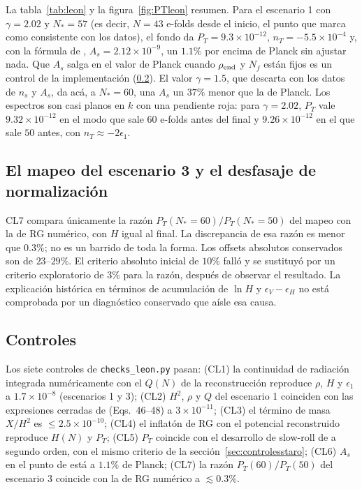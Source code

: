 La tabla~\ref{tab:leon} y la figura~\ref{fig:PTleon} resumen. Para el escenario 1 con $\gamma=2.02$ y $N_*=57$ (es decir, $N=43$ e-folds desde el inicio, el punto que \cite{piccirilli23} marca como consistente con los datos), el fondo da $P_T=9.3\times10^{-12}$, $n_T=-5.5\times10^{-4}$ y, con la fórmula de \cite{piccirilli23}, $A_s=2.12\times10^{-9}$, un $1.1\%$ por encima de Planck sin ajustar nada. Que $A_s$ salga en el valor de Planck cuando $\rho_{\rm end}$ y $N_f$ están fijos es un control de la implementación (\ref{sec:leoncontroles}). El valor $\gamma=1.5$, que \cite{piccirilli23} descarta con los datos de $n_s$ y $A_s$, da acá, a $N_*=60$, una $A_s$ un $37\%$ menor que la de Planck. Los espectros son casi planos en $k$ con una pendiente roja: para $\gamma=2.02$, $P_T$ vale $9.32\times10^{-12}$ en el modo que sale $60$ e-folds antes del final y $9.26\times10^{-12}$ en el que sale $50$ antes, con $n_T\approx-2\epsilon_1$.

\subsection{El mapeo del escenario 3 y el desfasaje de normalización}
\label{sec:leonmapeo}

CL7 compara únicamente la razón $P_T(N_*=60)/P_T(N_*=50)$ del mapeo con la de RG numérico, con $H$ igual al final. La discrepancia de esa razón es menor que $0.3\%$; no es un barrido de toda la forma. Los offsets absolutos conservados son de $23$--$29\%$. El criterio absoluto inicial de $10\%$ falló y se sustituyó por un criterio exploratorio de $3\%$ para la razón, después de observar el resultado. La explicación histórica en términos de acumulación de $\ln H$ y $\epsilon_V-\epsilon_H$ no está comprobada por un diagnóstico conservado que aísle esa causa.

\subsection{Controles}
\label{sec:leoncontroles}

Los siete controles de \texttt{checks\_leon.py} pasan: (CL1) la continuidad de radiación integrada numéricamente con el $Q(N)$ de la reconstrucción reproduce $\rho$, $H$ y $\epsilon_1$ a $1.7\times10^{-8}$ (escenarios 1 y 3); (CL2) $H^2$, $\rho$ y $Q$ del escenario 1 coinciden con las expresiones cerradas de \cite{piccirilli23} (Eqs.~46--48) a $3\times10^{-11}$; (CL3) el término de masa $X/H^2$ es $\le2.5\times10^{-10}$; (CL4) el inflatón de RG con el potencial reconstruido reproduce $H(N)$ y $P_T$; (CL5) $P_T$ coincide con el desarrollo de slow-roll de \cite{martin14} a segundo orden, con el mismo criterio de la sección~\ref{sec:controlesstaro}; (CL6) $A_s$ en el punto de \cite{piccirilli23} está a $1.1\%$ de Planck; (CL7) la razón $P_T(60)/P_T(50)$ del escenario 3 coincide con la de RG numérico a $\lesssim0.3\%$.

